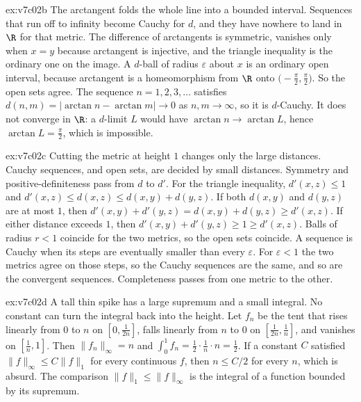 \begin{solution}{ex:v7c02b}
\idea The arctangent folds the whole line into a bounded interval. Sequences that run off to infinity become Cauchy for $d$, and they have nowhere to land in $\R$ for that metric.
\writeup The difference of arctangents is symmetric, vanishes only when $x=y$ because arctangent is injective, and the triangle inequality is the ordinary one on the image. A $d$-ball of radius $\varepsilon$ about $x$ is an ordinary open interval, because arctangent is a homeomorphism from $\R$ onto $\bigl(-\frac\pi2,\frac\pi2\bigr)$. So the open sets agree. The sequence $n=1,2,3,\ldots$ satisfies $d(n,m)=|\arctan n-\arctan m|\to0$ as $n,m\to\infty$, so it is $d$-Cauchy. It does not converge in $\R$: a $d$-limit $L$ would have $\arctan n\to\arctan L$, hence $\arctan L=\frac\pi2$, which is impossible.
\end{solution}

\begin{solution}{ex:v7c02c}
\idea Cutting the metric at height $1$ changes only the large distances. Cauchy sequences, and open sets, are decided by small distances.
\writeup Symmetry and positive-definiteness pass from $d$ to $d'$. For the triangle inequality, $d'(x,z)\le 1$ and $d'(x,z)\le d(x,z)\le d(x,y)+d(y,z)$. If both $d(x,y)$ and $d(y,z)$ are at most $1$, then $d'(x,y)+d'(y,z)=d(x,y)+d(y,z)\ge d'(x,z)$. If either distance exceeds $1$, then $d'(x,y)+d'(y,z)\ge 1\ge d'(x,z)$. Balls of radius $r<1$ coincide for the two metrics, so the open sets coincide. A sequence is Cauchy when its steps are eventually smaller than every $\varepsilon$. For $\varepsilon<1$ the two metrics agree on those steps, so the Cauchy sequences are the same, and so are the convergent sequences. Completeness passes from one metric to the other.
\end{solution}

\begin{solution}{ex:v7c02d}
\idea A tall thin spike has a large supremum and a small integral. No constant can turn the integral back into the height.
\writeup Let $f_n$ be the tent that rises linearly from $0$ to $n$ on $[0,\frac1{2n}]$, falls linearly from $n$ to $0$ on $[\frac1{2n},\frac1n]$, and vanishes on $[\frac1n,1]$. Then $\|f_n\|_\infty=n$ and $\int_0^1 f_n=\frac12\cdot\frac1n\cdot n=\frac12$. If a constant $C$ satisfied $\|f\|_\infty\le C\|f\|_1$ for every continuous $f$, then $n\le C/2$ for every $n$, which is absurd. The comparison $\|f\|_1\le\|f\|_\infty$ is the integral of a function bounded by its supremum.
\end{solution}

